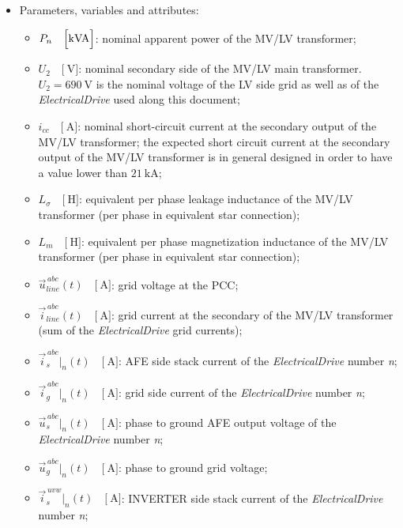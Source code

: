 \documentclass[12pt,a4paper]{scrartcl}
\begin{document}
\begin{onehalfspace}
\begin{itemize}
	\item[--] Parameters, variables and attributes:
	\begin{itemize}
		\item[--] $P_n\quad\Big[\SI{}{\kilo{\volt\ampere}}\Big]$: nominal apparent power of the MV/LV transformer;	
		\item[--] $U_{2}\quad\Big[\SI{}{\volt}\Big]$: nominal secondary side of the MV/LV main transformer. $U_{2} = \SI{690}{\volt}$ is the nominal voltage of the LV side grid as well as of the \textit{ElectricalDrive} used along this document;			
		\item[--] $i_{cc}\quad\Big[\SI{}{\ampere}\Big]$: nominal short-circuit current at the secondary output of the MV/LV transformer;	the expected short circuit current at the secondary output of the MV/LV transformer is in general designed in order to have a value lower than $\SI{21}{\kilo\ampere}$;
		\item[--] $L_\sigma\quad\Big[\SI{}{\henry}\Big]$: equivalent per phase leakage inductance of the MV/LV transformer (per phase in equivalent star connection);			
		\item[--] $L_m\quad\Big[\SI{}{\henry}\Big]$: equivalent per phase magnetization inductance of the MV/LV transformer (per phase in equivalent star connection);
		\item[--] $\vec{u}_{line}^{\,abc}(t)\quad\Big[\SI{}{\ampere}\Big]$: grid voltage at the PCC;			
		\item[--] $\vec{i}_{line}^{\,abc}(t)\quad\Big[\SI{}{\ampere}\Big]$: grid current at the secondary of the MV/LV transformer (sum of the \textit{ElectricalDrive} grid currents);			
		\item[--] $\vec{i}_s^{\,abc}\Big|_n(t)\quad\Big[\SI{}{\ampere}\Big]$: AFE side stack current of the \textit{ElectricalDrive} number \textit{n};		
		\item[--] $\vec{i}_g^{\,abc}\Big|_n(t)\quad\Big[\SI{}{\ampere}\Big]$: grid side current of the \textit{ElectricalDrive} number \textit{n};
		\item[--] $\vec{u}_s^{\,abc}\Big|_n(t)\quad\Big[\SI{}{\ampere}\Big]$: phase to ground AFE output voltage of the \textit{ElectricalDrive} number \textit{n};
		\item[--] $\vec{u}_g^{\,abc}\Big|_n(t)\quad\Big[\SI{}{\ampere}\Big]$: phase to ground grid voltage;
		\item[--] $\vec{i}_s^{\,uvw}\Big|_n(t)\quad\Big[\SI{}{\ampere}\Big]$: INVERTER side stack current of the \textit{ElectricalDrive} number \textit{n};	

\end{itemize}
\end{itemize}
\end{onehalfspace}
\end{document}

